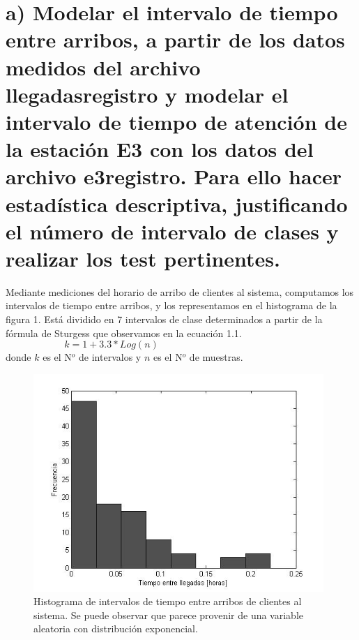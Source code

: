 \documentclass{article}
\numberwithin{equation}{section}
\numberwithin{figure}{section}
\numberwithin{table}{section}
\begin{document}
%
%
\setcounter{page}{1}

%
%
\tableofcontents
\newpage

%
%

\newpage


\section*{a)   Modelar el intervalo de tiempo entre arribos, a partir de los datos medidos del archivo
llegadasregistro y modelar el intervalo de tiempo de atenci\'on de la estaci\'on E3 con los
datos del archivo e3registro. Para ello hacer estad\'istica descriptiva, justificando el n\'umero
de intervalo de clases y realizar los test pertinentes.
}

Mediante mediciones del horario de arribo de clientes al sistema, computamos
los intervalos de tiempo entre arribos, y los representamos en el histograma
de la figura 1. Est\'a dividido en 7 intervalos de clase determinados a partir
de la f\'ormula de Sturgess que observamos en la ecuaci\'on 1.1.
\begin{equation}
 k = 1 + 3.3 * Log(n)  \hspace{6cm} 
\end{equation}
donde $k$ es el N$^o$ de intervalos y $n$ es el N$^o$ de muestras.

\begin{figure}
\begin{center}
\includegraphics[width=11cm]{histograma_llegadas}
\caption{Histograma de intervalos de tiempo entre arribos de clientes al sistema. Se puede observar que parece provenir de una variable aleatoria con distribuci\'on exponencial.}
\end{center}
\end{figure}
\end{document}
